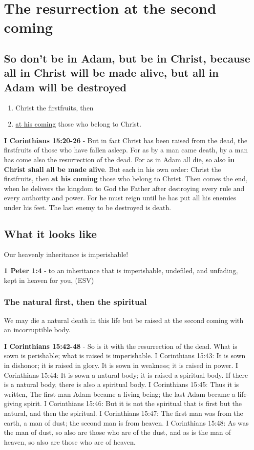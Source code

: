 \documentclass[11pt]{article}
\begin{document}
\section{The resurrection at the second coming}
\label{sec:org68192b9}
\subsection{So don't be in Adam, but be in Christ, because all in Christ will be made alive, but all in Adam will be destroyed}
\label{sec:orgd058529}
\begin{enumerate}
\item Christ the firstfruits, then
\item \uline{at his coming} those who belong to Christ.
\end{enumerate}

\textbf{I Corinthians 15:20-26} - But in fact Christ has been raised from the dead, the firstfruits of those who have fallen asleep.  For as by a man came death, by a man has come also the resurrection of the dead.  For as in Adam all die, so also \textbf{in Christ shall all be made alive}.  But each in his own order: Christ the firstfruits, then \textbf{at his coming} those who belong to Christ.  Then comes the end, when he delivers the kingdom to God the Father after destroying every rule and every authority and power.  For he must reign until he has put all his enemies under his feet.  The last enemy to be destroyed is death.

\subsection{What it looks like}
\label{sec:orgd7f14cf}
Our heavenly inheritance is imperishable!

\textbf{1 Peter 1:4} -  to an inheritance that is imperishable, undefiled, and unfading, kept in heaven for you,  (ESV)

\subsubsection{The natural first, then the spiritual}
\label{sec:orga984140}
We may die a natural death in this life but be raised at the second coming with an incorruptible body.

\textbf{I Corinthians 15:42-48} - So is it with the resurrection of the dead. What is sown is perishable; what is raised is imperishable. I Corinthians 15:43: It is sown in dishonor; it is raised in glory. It is sown in weakness; it is raised in power. I Corinthians 15:44: It is sown a natural body; it is raised a spiritual body. If there is a natural body, there is also a spiritual body. I Corinthians 15:45: Thus it is written, The first man Adam became a living being; the last Adam became a life-giving spirit. I Corinthians 15:46: But it is not the spiritual that is first but the natural, and then the spiritual. I Corinthians 15:47: The first man was from the earth, a man of dust; the second man is from heaven. I Corinthians 15:48: As was the man of dust, so also are those who are of the dust, and as is the man of heaven, so also are those who are of heaven.
\end{document}
